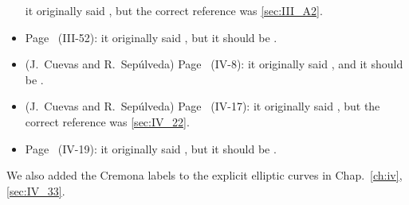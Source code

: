 \begin{itemize}
	it originally said , but the correct reference was \ref{sec:III_A2}.
\item Page~\pageref{errata:Gal_to_Gab} (III-52):
	it originally said , but it should be .
\item (J.~Cuevas and R.~Sepúlveda)
	Page~\pageref{errata:uv12} (IV-8):
	it originally said , and it
	should be .
\item (J.~Cuevas and R.~Sepúlveda)
	Page~\pageref{errata:wrongsec} (IV-17):
	it originally said , but the
	correct reference was \ref{sec:IV_22}.
\item Page~\pageref{errata:widetilde_Gl} (IV-19):
	it originally said , but
	it should be .
\end{itemize}
We also added the Cremona labels to the explicit elliptic curves in
Chap.~\ref{ch:iv}, \ref{sec:IV_33}.
